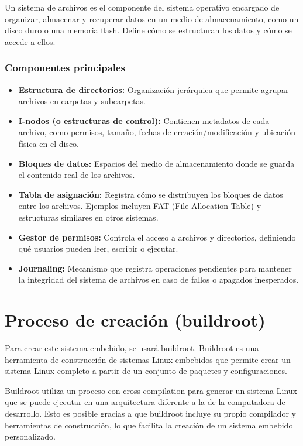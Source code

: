 \documentclass[12pt, letterpaper]{article}
\begin{document}
	Un sistema de archivos es el componente del sistema operativo encargado de organizar, almacenar y recuperar datos en un medio de almacenamiento, como un disco duro o una memoria flash. Define cómo se estructuran los datos y cómo se accede a ellos.

	\subsubsection{Componentes principales}

	\begin{itemize}
		\item \textbf{Estructura de directorios:} Organización jerárquica que permite agrupar archivos en carpetas y subcarpetas.
		\item \textbf{I-nodos (o estructuras de control):} Contienen metadatos de cada archivo, como permisos, tamaño, fechas de creación/modificación y ubicación física en el disco.
		\item \textbf{Bloques de datos:} Espacios del medio de almacenamiento donde se guarda el contenido real de los archivos.
		\item \textbf{Tabla de asignación:} Registra cómo se distribuyen los bloques de datos entre los archivos. Ejemplos incluyen FAT (File Allocation Table) y estructuras similares en otros sistemas.
		\item \textbf{Gestor de permisos:} Controla el acceso a archivos y directorios, definiendo qué usuarios pueden leer, escribir o ejecutar.
		\item \textbf{Journaling:} Mecanismo que registra operaciones pendientes para mantener la integridad del sistema de archivos en caso de fallos o apagados inesperados.
	\end{itemize}

	\section{Proceso de creación (buildroot)}

	Para crear este sistema embebido, se usará buildroot. Buildroot es una herramienta de construcción de sistemas Linux embebidos que permite crear un sistema Linux completo a partir de un conjunto de paquetes y configuraciones.

	Buildroot utiliza un proceso con cross-compilation para generar un sistema Linux que se puede ejecutar en una arquitectura diferente a la de la computadora de desarrollo. Esto es posible gracias a que buildroot incluye su propio compilador y herramientas de construcción, lo que facilita la creación de un sistema embebido personalizado.
\end{document}
